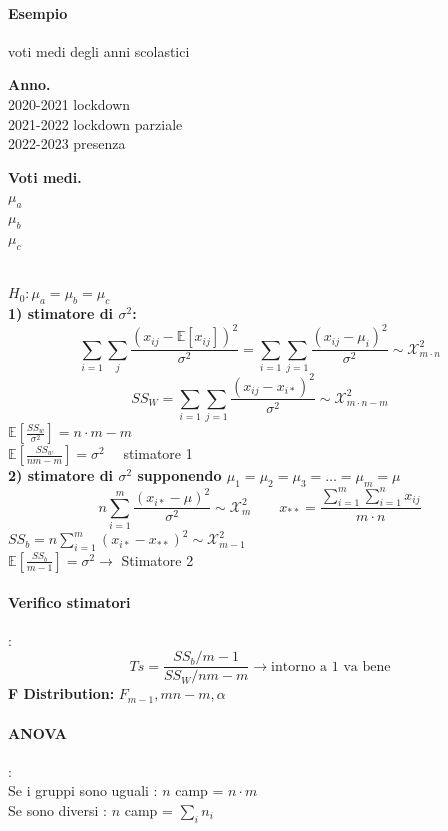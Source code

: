 \documentclass[]{article}
\newcommand{\ev}{\mathbb{E}[X]}
\renewcommand{\ev}[1]{\mathbb{E}\left[#1\right]}
\begin{document}
    \paragraph{Esempio} voti medi degli anni scolastici \\[2ex]
    \begin{minipage}{0.45\textwidth}
        \textbf{Anno.} \\
        2020-2021 lockdown \\
        2021-2022 lockdown parziale \\
        2022-2023 presenza
    \end{minipage}
    \begin{minipage}{0.45\textwidth}
        \textbf{Voti medi.} \\
        $\mu_a$ \\
        $\mu_b$ \\
        $\mu_c$
    \end{minipage} \\[2ex]
    $H_0 : \mu_a = \mu_b = \mu_c$ \\[3ex]
    \textbf{1) stimatore di $\sigma^2$:} \\
    \[ \sum_{i=1}^{} \sum_{j}^{} \frac{(x_{ij} - \ev{x_{ij}})^2}{\sigma^2} = \sum_{i=1}^{} \sum_{j=1}^{} \frac{(x_{ij} - \mu_i)^2}{\sigma^2} \sim \mathcal{X}^2_{m\cdot n} \]
    \[ SS_W = \sum_{i=1}^{} \sum_{j=1}^{} \frac{(x_{ij} - x_{i*})^2}{\sigma^2} \sim \mathcal{X}^2_{m \cdot n - m} \]
    $\ev{\frac{SS_w}{\sigma^2}} = n \cdot m - m$ \\[2ex]
    $\ev{\frac{SS_w}{nm - m}} = \sigma^2 \quad$ stimatore 1 \\[4ex]
    \textbf{2) stimatore di $\sigma^2$ supponendo $\mu_1 = \mu_2 = \mu_3 = \ldots = \mu_m = \mu$}
    \[ n \sum_{i=1}^{m} \frac{(x_{i*} - \mu)^2}{\sigma^2} \sim \mathcal{X}^2_m \qquad x_{**} = \frac{\sum_{i=1}^{m} \sum_{i=1}^{n} x_{ij}}{m \cdot n} \]
    $SS_b = n \sum_{i = 1}^{m} (x_{i*} - x_{**})^2 \sim \mathcal{X}^2_{m-1}$ \\
    $\ev{\frac{SS_b}{m-1}} = \sigma^2 \rightarrow$ Stimatore 2
    \paragraph{Verifico stimatori}:
    \[ Ts = \frac{SS_b / m-1}{SS_W / nm - m} \rightarrow \text{intorno a 1 va bene}\]
    \textbf{F Distribution:} $F_{m-1}, mn - m, \alpha$
    \paragraph{ANOVA}: \\
    Se i gruppi sono uguali : $n $ camp = $n \cdot m$ \\
    Se sono diversi : $n $ camp = $\sum_{i}^{} n_i$
\end{document}
